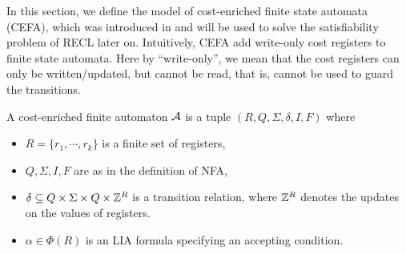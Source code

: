 %

In this section, we define the model of cost-enriched finite state automata (CEFA), which was introduced in \cite{atva2020} and will be used to solve the satisfiability problem of RECL later on. 
%
Intuitively, CEFA add write-only cost registers to finite state automata. Here by ``write-only'', we mean that the cost registers can only be written/updated, but cannot be read, that is, cannot be used to guard the transitions. 

%
\begin{definition}
  A cost-enriched finite automaton $\mathcal{A}$ is a tuple $(R, Q, \Sigma, \delta, I, F)$ where
  \begin{itemize}
  \item $R = \{r_1, \cdots, r_k\}$ is a finite set of registers, 
    \item $Q, \Sigma, I, F$ are as in the definition of NFA,
    \item $\delta \subseteq Q \times \Sigma \times Q \times \mathbb{Z}^R$ is a transition relation, where $\mathbb{Z}^R$ denotes the updates on the values of registers.
    \item $\alpha \in \Phi(R)$ is an LIA formula specifying an accepting condition.
  \end{itemize}
\end{definition}

